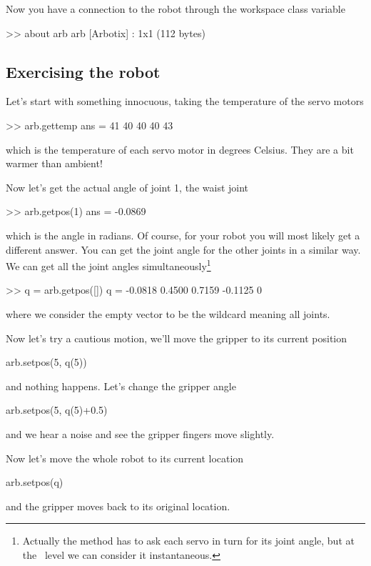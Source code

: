 \documentclass[11pt]{article}
\begin{document}
Now you have a connection to the robot through the workspace class variable 
\begin{Code}
>> about arb
arb [Arbotix] : 1x1 (112 bytes)
\end{Code}

\subsection{Exercising the robot}
Let's start with something innocuous, taking the temperature of the servo motors
\begin{Code}
>> arb.gettemp
ans =
    41    40    40    40    43
\end{Code}
which is the temperature of each servo motor in degrees Celsius.  They are a bit warmer than ambient!

Now let's get the actual angle of joint 1, the waist joint
\begin{Code}
>> arb.getpos(1)
ans =
   -0.0869
\end{Code}
which is the angle in radians.  Of course, for your robot you will most likely get a different answer.  You can get the joint
angle for the other joints in a similar way.
We can get all the joint angles simultaneously\footnote{Actually the method has to ask each servo in turn for its
joint angle, but at the \Mlab\ level we can consider it instantaneous.}
\begin{Code}
>> q = arb.getpos([])
q =
   -0.0818    0.4500    0.7159   -0.1125         0
\end{Code}
where we consider the empty vector \var{[]} to be the wildcard meaning all joints.

Now let's try a cautious motion, we'll move the gripper to its current position
\begin{Code}
arb.setpos(5, q(5))
\end{Code}
and nothing happens.  Let's change the gripper angle
\begin{Code}
arb.setpos(5, q(5)+0.5)
\end{Code}
and we hear a noise and see the gripper fingers move slightly.

Now let's move the whole robot to its current location
\begin{Code}
arb.setpos(q)
\end{Code}
and the gripper moves back to its original location.
\end{document}
